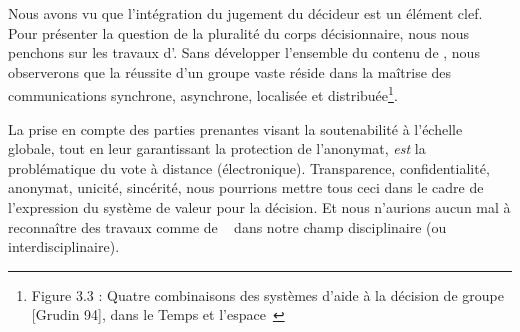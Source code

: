 %
%
%

Nous avons vu que l'intégration du jugement du décideur est un élément clef.
Pour présenter la question de la pluralité du corps décisionnaire, nous nous penchons sur les travaux d'\citeauthor{adla_aide_2010}.
Sans développer l'ensemble du contenu de , nous observerons que la réussite d'un groupe vaste réside dans la maîtrise des communications synchrone, asynchrone, localisée et distribuée\footnote{Figure 3.3 : Quatre combinaisons des systèmes d’aide à la décision de groupe [Grudin 94], dans le Temps et l'espace~\cite{adla_aide_2010}}.

La prise en compte des parties prenantes visant la soutenabilité à l'échelle globale, tout en leur garantissant la protection de l'anonymat, \emph{est} la problématique du vote à distance (électronique).
Transparence, confidentialité, anonymat, unicité, sincérité, nous pourrions mettre tous ceci dans le cadre de l'expression du système de valeur pour la décision.
Et nous n'aurions aucun mal à reconnaître des travaux comme  de \citeauthor{enguehard_vote_2007}~\cite{enguehard_vote_2007} dans notre champ disciplinaire (ou interdisciplinaire).

